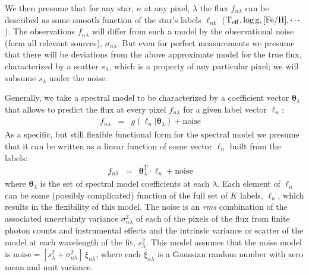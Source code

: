 \documentclass[12pt, preprint]{aastex}
\newcommand{\set}[1]{\bm{#1}}
\newcommand{\starlabel}{\ell}
\newcommand{\starlabelvec}{\set{\starlabel}}
\newcommand{\teff}{\mbox{$\rm T_{eff}$}}
\newcommand{\feh}{\mbox{$\rm [Fe/H]$}}
\newcommand{\logg}{\mbox{$\rm \log g$}}
\newcommand{\noise}{\sigma_{n\lambda}}
\newcommand{\scatter}{s_{\lambda}}
\begin{document}
We then presume that for any star, $n$ at any pixel, $\lambda$  the flux $f_{n\lambda}$  can be described as some smooth function of the star's labels $\starlabel_{nk}$
($\teff,\logg,\feh,\cdots$).
The observations $f_{n\lambda}$ will differ from such a model by the observational noise (form all relevant sources), $\noise$. But even for perfect measurements we presume that there will be
deviations from the above approximate model for the true flux, characterized by a scatter $\scatter$,
which is a property of any particular pixel; we will subsume $\scatter$ under the noise.

Generally, we take a spectral model to be characterized by a coefficient vector $\set{\theta}_\lambda$
that allows to predict the flux at every pixel $f_{n\lambda}$ for a given label vector 
$\starlabelvec_n$:
\begin{eqnarray}
f_{n\lambda} &=&
g(\starlabelvec_n |  \set{\theta}_\lambda) + \mbox{noise}
\label{eq:specmodel}\quad 
\end{eqnarray}
As a specific, but still flexible functional form for the spectral model we presume that it can be written as
a linear function of some vector $\starlabelvec_n$ built from the labels: 
\begin{eqnarray}
f_{n\lambda} &=&
\set{\theta}_\lambda^T \cdot \starlabelvec_n + \mbox{noise}
\label{eq:linearmodel}\quad
\end{eqnarray}
where $\set{\theta}_\lambda$ is the set of spectral model coefficients at each $\lambda$. Each element of $\starlabelvec_n$ can be some (possibly complicated) function of the full set of $K$ labels, $\starlabelvec_n$, which
results in the flexibility of this model. The noise is an \textit{rms} combination of the associated uncertainty variance
$\sigma_{n\lambda}^2$ of each of the pixels of the flux from finite photon counts and instrumental effects and the intrinsic variance or scatter of the model at each wavelength of the fit, $s_\lambda^2$.
This model assumes that the noise model is
$\mbox{noise} = [s_\lambda^2+ \sigma_{n\lambda}^2]\,\xi_{n\lambda}$,
where each $\xi_{n\lambda}$ is a Gaussian random number with zero mean and unit
variance.
\end{document}
